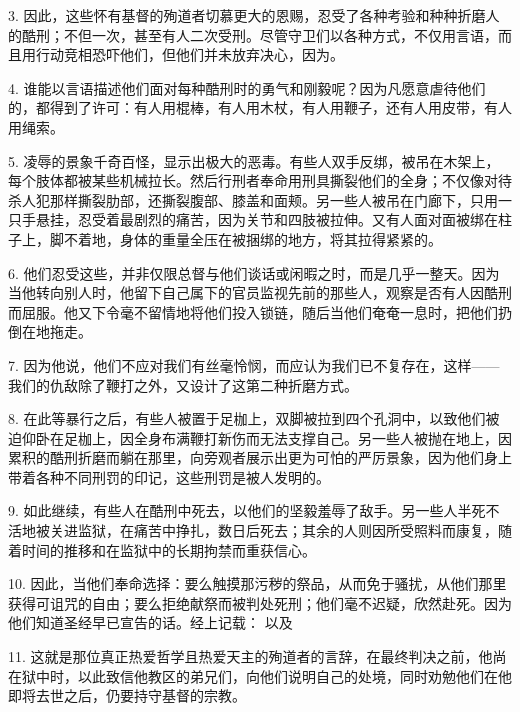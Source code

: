 3. 因此，这些怀有基督的殉道者切慕更大的恩赐，忍受了各种考验和种种折磨人的酷刑；不但一次，甚至有人二次受刑。尽管守卫们以各种方式，不仅用言语，而且用行动竞相恐吓他们，但他们并未放弃决心，因为。\par

4. 谁能以言语描述他们面对每种酷刑时的勇气和刚毅呢？因为凡愿意虐待他们的，都得到了许可：有人用棍棒，有人用木杖，有人用鞭子，还有人用皮带，有人用绳索。\par

5. 凌辱的景象千奇百怪，显示出极大的恶毒。有些人双手反绑，被吊在木架上，每个肢体都被某些机械拉长。然后行刑者奉命用刑具撕裂他们的全身；不仅像对待杀人犯那样撕裂肋部，还撕裂腹部、膝盖和面颊。另一些人被吊在门廊下，只用一只手悬挂，忍受着最剧烈的痛苦，因为关节和四肢被拉伸。又有人面对面被绑在柱子上，脚不着地，身体的重量全压在被捆绑的地方，将其拉得紧紧的。\par

6. 他们忍受这些，并非仅限总督与他们谈话或闲暇之时，而是几乎一整天。因为当他转向别人时，他留下自己属下的官员监视先前的那些人，观察是否有人因酷刑而屈服。他又下令毫不留情地将他们投入锁链，随后当他们奄奄一息时，把他们扔倒在地拖走。\par

7. 因为他说，他们不应对我们有丝毫怜悯，而应认为我们已不复存在，这样——我们的仇敌除了鞭打之外，又设计了这第二种折磨方式。\par

8. 在此等暴行之后，有些人被置于足枷上，双脚被拉到四个孔洞中，以致他们被迫仰卧在足枷上，因全身布满鞭打新伤而无法支撑自己。另一些人被抛在地上，因累积的酷刑折磨而躺在那里，向旁观者展示出更为可怕的严厉景象，因为他们身上带着各种不同刑罚的印记，这些刑罚是被人发明的。\par

9. 如此继续，有些人在酷刑中死去，以他们的坚毅羞辱了敌手。另一些人半死不活地被关进监狱，在痛苦中挣扎，数日后死去；其余的人则因所受照料而康复，随着时间的推移和在监狱中的长期拘禁而重获信心。\par

10. 因此，当他们奉命选择：要么触摸那污秽的祭品，从而免于骚扰，从他们那里获得可诅咒的自由；要么拒绝献祭而被判处死刑；他们毫不迟疑，欣然赴死。因为他们知道圣经早已宣告的话。经上记载： 以及 \par

11. 这就是那位真正热爱哲学且热爱天主的殉道者的言辞，在最终判决之前，他尚在狱中时，以此致信他教区的弟兄们，向他们说明自己的处境，同时劝勉他们在他即将去世之后，仍要持守基督的宗教。\par

